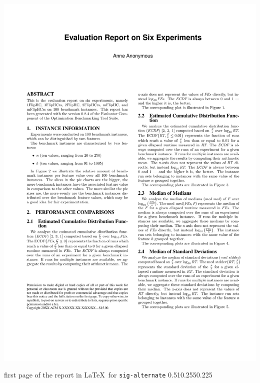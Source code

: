 \begin{frame}[t]
{{{\includegraphics[width=0.215\paperwidth,page=1]{graphics/maxsat_example/maxsat_example_reports/SigAlternate_report.pdf}%
}\strut\hfill\strut}%
}{%
first page of the report in \LaTeX\ for \texttt{sig-alternate}%
}{0.51}{0.255}{0.225}%
%
\end{frame}
